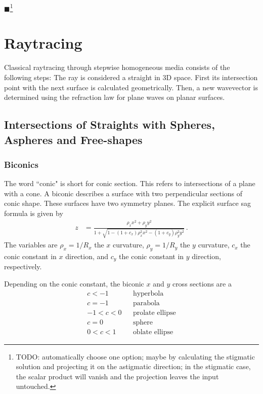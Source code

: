 \documentclass[12pt,a4paper,twoside,openright,BCOR10mm,headsepline,titlepage,abstracton,chapterprefix,final]{scrreprt}
\newcommand{\remark}[1]{{\color{red}$\blacksquare$}\footnote{{\color{red}#1}}}
\begin{document}
\remark{TODO: automatically choose one option; maybe by calculating the stigmatic solution 
and projecting it on the astigmatic direction; in the stigmatic case, the scalar product will vanish and the projection leaves the input untouched.}




\chapter{Raytracing}

Classical raytracing through stepwise homogeneous media consists of the following steps: 
The ray is considered a straight in 3D space. 
First its intersection point with the next surface is calculated geometrically. 
Then, a new wavevector is determined using the refraction law for plane waves on planar surfaces.


\section{Intersections of Straights with Spheres, Aspheres and Free-shapes}\label{subsec:intersectionformulas}

\subsection{Biconics}
The word ``conic" is short for conic section. 
This refers to intersections of a plane with a cone.
A biconic describes a surface with two perpendicular sections of conic shape. 
These surfaces have two symmetry planes.
The explicit surface sag formula is given by
\begin{align}
 z &= \frac{\rho_x x^2 + \rho_y y^2}{1 + \sqrt{1 - (1+c_x) \rho_x^2 x^2 - (1+c_y) \rho_y^2 y^2}} \label{eq:biconic}\,.
\end{align}
The variables are $\rho_x = 1/R_x$ the $x$ curvature, $\rho_y = 1/R_y$ the $y$ curvature, $c_x$ the conic constant in $x$ direction,
and $c_y$ the conic constant in $y$ direction, respectively. 

Depending on the conic constant, the biconic $x$ and $y$ cross sections are a
\begin{eqnarray*}
     c < -1 && \textrm{hyperbola} \\
     c = -1 && \textrm{parabola} \\
-1 < c < 0 && \textrm{prolate ellipse} \\
     c = 0 && \textrm{sphere} \\
 0 < c < 1 && \textrm{oblate ellipse}
\end{eqnarray*}
\end{document}
